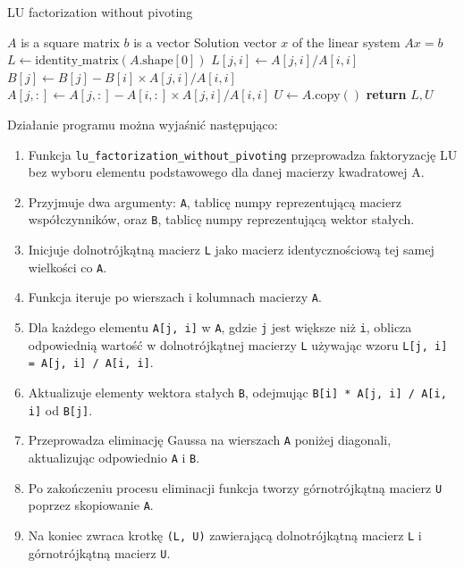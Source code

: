 \documentclass[9pt]{article}
\begin{document}
\begin{algorithm}
    \caption{LU factorization without pivoting}
    \begin{algorithmic}[1]
        \Require $A$ is a square matrix
        \Require $b$ is a vector
        \Ensure Solution vector $x$ of the linear system $Ax = b$
        \State $L \gets \text{identity\_matrix}(A.\text{shape}[0])$
                    \State $L[j, i] \gets A[j, i] / A[i, i]$
                    \State $B[j] \gets B[j] - B[i] \times A[j, i] / A[i, i]$
                    \State $A[j, :] \gets A[j, :] - A[i, :] \times A[j, i] / A[i, i]$
                \EndIf
            \EndFor
        \EndFor
        \State $U \gets A.\text{copy}()$
        \State \textbf{return} $L, U$
    \end{algorithmic}
\end{algorithm}

Działanie programu można wyjaśnić następująco:

\begin{enumerate}
    \item Funkcja \texttt{lu\_factorization\_without\_pivoting} przeprowadza faktoryzację LU bez wyboru elementu podstawowego dla danej macierzy kwadratowej A.
    \item Przyjmuje dwa argumenty: \texttt{A}, tablicę numpy reprezentującą macierz współczynników, oraz \texttt{B}, tablicę numpy reprezentującą wektor stałych.
    \item Inicjuje dolnotrójkątną macierz \texttt{L} jako macierz identycznościową tej samej wielkości co \texttt{A}.
    \item Funkcja iteruje po wierszach i kolumnach macierzy \texttt{A}.
    \item Dla każdego elementu \texttt{A[j, i]} w \texttt{A}, gdzie \texttt{j} jest większe niż \texttt{i}, oblicza odpowiednią wartość w dolnotrójkątnej macierzy \texttt{L} używając wzoru \texttt{L[j, i] = A[j, i] / A[i, i]}.
    \item Aktualizuje elementy wektora stałych \texttt{B}, odejmując \texttt{B[i] * A[j, i] / A[i, i]} od \texttt{B[j]}.
    \item Przeprowadza eliminację Gaussa na wierszach \texttt{A} poniżej diagonali, aktualizując odpowiednio \texttt{A} i \texttt{B}.
    \item Po zakończeniu procesu eliminacji funkcja tworzy górnotrójkątną macierz \texttt{U} poprzez skopiowanie \texttt{A}.
    \item Na koniec zwraca krotkę \texttt{(L, U)} zawierającą dolnotrójkątną macierz \texttt{L} i górnotrójkątną macierz \texttt{U}.
\end{enumerate}
\end{document}
